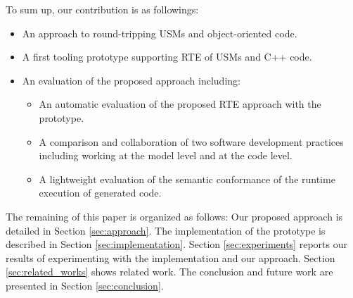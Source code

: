 To sum up, our contribution is as followings:
\begin{itemize}
  \item An approach to round-tripping USMs and object-oriented code.
  \item A first tooling prototype supporting RTE of USMs and C++ code.
  \item An evaluation of the proposed approach including:
  \begin{itemize}
 	 \item An automatic evaluation of the proposed RTE approach with the prototype.%
  	 \item A comparison and collaboration of two software development practices including working at the model level and at the code level.
  	 \item A lightweight evaluation of the semantic conformance of the runtime execution of generated code.
  	\end{itemize}
\end{itemize}

The remaining of this paper is organized as follows: Our proposed approach is detailed in Section \ref{sec:approach}. The implementation of the prototype is described in Section \ref{sec:implementation}. Section \ref{sec:experiments} reports our results of experimenting with the implementation and our approach. Section \ref{sec:related_works} shows related work. The conclusion and future work are presented in Section \ref{sec:conclusion}.

